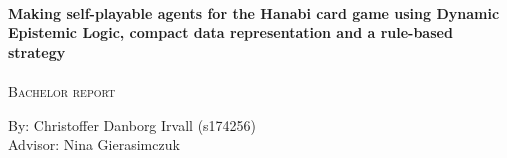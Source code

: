 \begin{titlepage}
	
	
	\HRule\\[0.5cm]
	
	{\huge\bfseries Making self-playable agents for the Hanabi card game using Dynamic Epistemic Logic, compact data representation and a rule-based strategy}\\[0.4cm] %

	\HRule\\[0.5cm]
	
	 \textsc{\Large Bachelor report}\\[1cm] %
	
    \begin{minipage}{0.7\textwidth}
		\begin{flushleft}
            \centering
            \large
            By: Christoffer Danborg Irvall (s174256) \\ [0.2cm]
            

	    Advisor: Nina Gierasimczuk \\
                        
		\end{flushleft}
	\end{minipage} 
    \\[1cm]
    \vfill \vfill



	
	\vfill\vfill\vfill %
	
	
	\vfill %
	
\end{titlepage}
